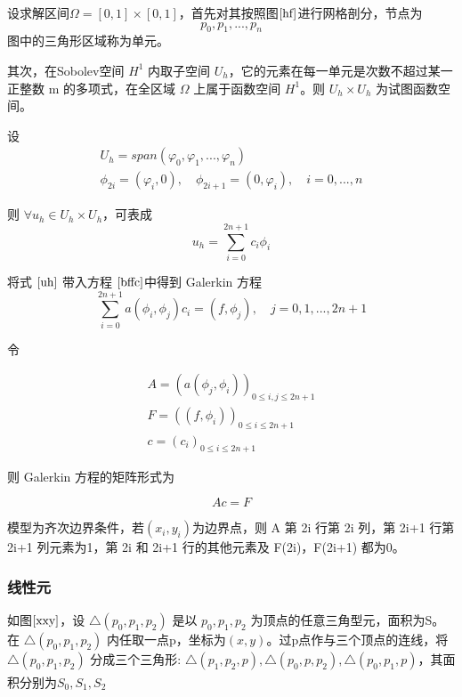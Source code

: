 \documentclass[a4paper,UTF8,titlepage]{ctexart}
\begin{document}
设求解区间$\Omega = [0,1] \times [0,1]$，首先对其按照图$\ref{hf}$进行网格剖分，节点为
$$
p_0, p_1, ... , p_n 
$$
图中的三角形区域称为单元。

其次，在Sobolev空间 $H^1$ 内取子空间 $U_h$，它的元素在每一单元是次数不超过某一正整数 m 的多项式，在全区域 $\Omega$ 上属于函数空间 $H^1$。则 $U_h \times U_h$ 为试图函数空间。

设
$$
\begin{matrix}
	U_h = span(\varphi_0, \varphi_1, ... , \varphi_n) \\
	\phi_{2i} = (\varphi_i, 0), \quad \phi_{2i+1} = (0, \varphi_i), \quad i=0,...,n
\end{matrix}
$$

则 $\forall u_h \in U_h \times U_h$，可表成
\begin{equation}
	u_h = \sum\limits_{i=0}^{2n+1} c_i \phi_i
	\label{uh}
\end{equation}

将式 $\eqref{uh}$ 带入方程 $\eqref{bffc}$中得到 Galerkin 方程
$$
	\sum\limits_{i=0}^{2n+1} a(\phi_i, \phi_j) c_i = (f,\phi_j), \quad j = 0, 1, ... , 2n+1 
$$ 

令

$$
\begin{matrix}
	A = (a(\phi_j, \phi_i))_{0 \le i,j \le 2n+1} \\
	F = ((f,\phi_i))_{0 \le i \le 2n+1} \\
	c = (c_i)_{0 \le i \le 2n+1}
\end{matrix}
$$

则 Galerkin 方程的矩阵形式为

$$
	Ac = F
$$

模型为齐次边界条件，若$(x_i,y_i)$为边界点，则 A 第 2i 行第 2i 列，第 2i+1 行第 2i+1 列元素为1，第 2i 和 2i+1 行的其他元素及  F(2i)，F(2i+1) 都为0。

\subsubsection{线性元}

如图$\ref{xxy}$，设 $ \bigtriangleup(p_0,p_1,p_2) $ 是以 $p_0,p_1,p_2$ 为顶点的任意三角型元，面积为S。在 $ \bigtriangleup (p_0,p_1,p_2) $ 内任取一点p，坐标为$(x,y)$。过p点作与三个顶点的连线，将 $ \bigtriangleup(p_0,p_1,p_2) $ 分成三个三角形: $ \bigtriangleup(p_1,p_2,p), \bigtriangleup(p_0,p,p_2), \bigtriangleup(p_0,p_1,p) $，其面积分别为$S_0,S_1,S_2$ \textsuperscript{\cite{李荣华2007偏微分方程数值解}}

\end{document}
